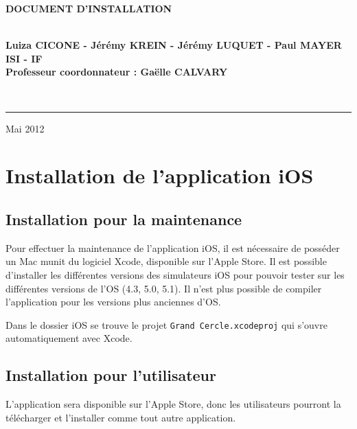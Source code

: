 \documentclass[a4paper, 11px]{article}
\begin{document}
\begin{titlepage}
\begin{center}
\begin{center}
{\Huge \bf DOCUMENT D'INSTALLATION}


\end{center}


\vspace{1cm}

\begin{center}
$ $\\
\large{ \textbf{Luiza CICONE - Jérémy KREIN - Jérémy LUQUET - Paul MAYER}}\\
\large{ \textbf{ISI - IF}}\\
\large{ \textbf{Professeur coordonnateur : Gaëlle CALVARY}}

$ $\\
\end{center}
\rule{\linewidth}{.5pt}


\vfill


{\large Mai 2012}

\end{center}
\end{titlepage}

\tableofcontents

\newpage


\section{Installation de l'application iOS}
\subsection{Installation pour la maintenance}
Pour effectuer la maintenance de l'application iOS, il est nécessaire de posséder un Mac munit du logiciel Xcode, disponible sur l'Apple Store. 
Il est possible d'installer les différentes versions des simulateurs iOS pour pouvoir tester sur les différentes versions de l'OS (4.3, 5.0, 5.1). Il n'est plus possible de compiler l'application pour les versions plus anciennes d'OS.

Dans le dossier iOS se trouve le projet \lstinline!Grand Cercle.xcodeproj! qui s'ouvre automatiquement avec Xcode.

\subsection{Installation pour l'utilisateur}
L'application sera disponible sur l'Apple Store, donc les utilisateurs pourront la télécharger et l'installer comme tout autre application.
\end{document}
